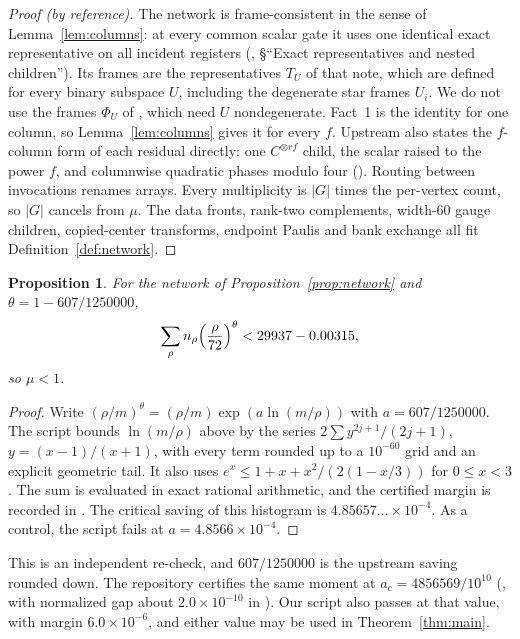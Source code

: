 \documentclass[11pt]{article}
\newtheorem{proposition}[theorem]{Proposition}
\theoremstyle{definition}
\begin{document}
\begin{proof}[Proof (by reference)]
The network is frame-consistent in the sense of Lemma~\ref{lem:columns}: at every
common scalar gate it uses one identical exact representative on all incident
registers (, \S``Exact representatives
and nested children''). Its frames are the representatives $T_U$ of that note,
which are defined for every binary subspace $U$, including the degenerate star
frames $U_i$. We do not use the frames $\Phi_U$ of \cite[(2.5)]{oai-dft}, which
need $U$ nondegenerate. Fact~1 is the identity for one column, so
Lemma~\ref{lem:columns} gives it for every $f$. Upstream also states the
$f$-column form of each residual directly: one $C^{\otimes rf}$ child, the scalar
raised to the power $f$, and columnwise quadratic phases modulo four
(). Routing between invocations
renames arrays. Every multiplicity is $|G|$ times the per-vertex count, so
$|G|$ cancels from $\mu$. The data fronts, rank-two complements, width-$60$ gauge
children, copied-center transforms, endpoint Paulis and bank exchange all
fit Definition~\ref{def:network}.
\end{proof}

\begin{proposition}\label{prop:moment}
For the network of Proposition~\ref{prop:network} and $\theta=1-607/1250000$,
\[
 \sum_\rho n_\rho\Bigl(\frac\rho{72}\Bigr)^{\theta}<29937-0.00315,
\]
so $\mu<1$.
\end{proposition}

\begin{proof}
Write $(\rho/m)^\theta=(\rho/m)\exp(a\ln(m/\rho))$ with $a=607/1250000$. The
script  bounds $\ln(m/\rho)$ above by the
series $2\sum y^{2j+1}/(2j+1)$, $y=(x-1)/(x+1)$, with every term rounded up to a
$10^{-60}$ grid and an explicit geometric tail. It also uses
$e^x\le1+x+x^2/(2(1-x/3))$ for $0\le x<3$. The sum is evaluated in exact
rational arithmetic, and the certified margin is recorded in
. The critical saving of this histogram is
$4.85657\ldots\times10^{-4}$. As a control, the script fails at
$a=4.8566\times10^{-4}$.
\end{proof}

This is an independent re-check, and $607/1250000$ is the upstream saving
rounded down. The repository \cite{cms} certifies the same moment at
$a_c=4856569/10^{10}$ (, with normalized gap
about $2.0\times10^{-10}$ in ). Our script
also passes at that value, with margin $6.0\times10^{-6}$, and either value may
be used in Theorem~\ref{thm:main}.
\end{document}
